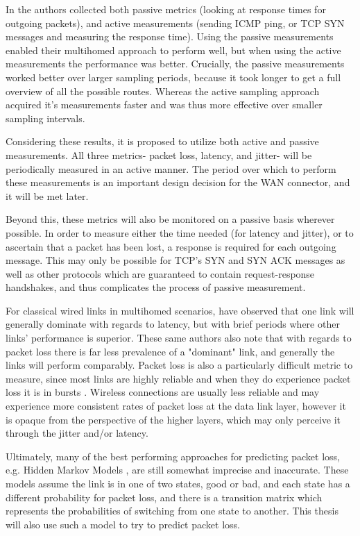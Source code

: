 In \cite{akella2008performance} the authors collected both passive metrics (looking at response times for outgoing packets), and active measurements (sending ICMP ping, or TCP SYN messages and measuring the response time). Using the passive measurements enabled their multihomed approach to perform well, but when using the active measurements the performance was better. Crucially, the passive measurements worked better over larger sampling periods, because it took longer to get a full overview of all the possible routes. Whereas the active sampling approach acquired it's measurements faster and was thus more effective over smaller sampling intervals.

Considering these results, it is proposed to utilize both active and passive measurements. All three metrics- packet loss, latency, and jitter- will be periodically measured in an active manner. The period over which to perform these measurements is an important design decision for the WAN connector, and it will be met later.

Beyond this, these metrics will also be monitored on a passive basis wherever possible. In order to measure either the time needed (for latency and jitter), or to ascertain that a packet has been lost, a response is required for each outgoing message. This may only be possible for TCP's SYN and SYN ACK messages as well as other protocols which are guaranteed to contain request-response handshakes, and thus complicates the process of passive measurement.

For classical wired links in multihomed scenarios, \cite{tao2004exploring} have observed that one link will generally dominate with regards to latency, but with brief periods where other links' performance is superior. These same authors also note that with regards to packet loss there is far less prevalence of a "dominant" link, and generally the links will perform comparably. Packet loss is also a particularly difficult metric to measure, since most links are highly reliable and when they do experience packet loss it is in bursts \cite{tao2004exploring}. Wireless connections are usually less reliable and may experience more consistent rates of packet loss at the data link layer, however it is opaque from the perspective of the higher layers, which may only perceive it through the jitter and/or latency.

 Ultimately, many of the best performing approaches for predicting packet loss, e.g. Hidden Markov Models \cite{tao2004exploring, bremler2002predicting}, are still somewhat imprecise and inaccurate. These models assume the link is in one of two states, good or bad, and each state has a different probability for packet loss, and there is a transition matrix which represents the probabilities of switching from one state to another. This thesis will also use such a model to try to predict packet loss. 

